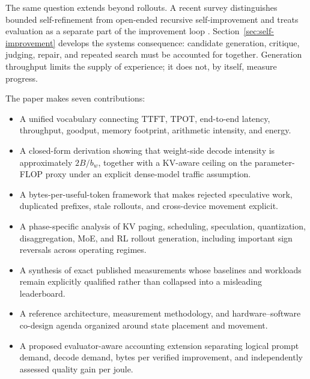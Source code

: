 \documentclass[journal]{IEEEtran}
\newcommand{\TTFT}{\ensuremath{\mathrm{TTFT}}}
\newcommand{\TPOT}{\ensuremath{\mathrm{TPOT}}}
\begin{document}
The same question extends beyond rollouts. A recent survey distinguishes bounded self-refinement from open-ended recursive self-improvement and treats evaluation as a separate part of the improvement loop \cite{chen2026rsi}. Section~\ref{sec:self-improvement} develops the systems consequence: candidate generation, critique, judging, repair, and repeated search must be accounted for together. Generation throughput limits the supply of experience; it does not, by itself, measure progress.

The paper makes seven contributions:
\begin{itemize}
    \item A unified vocabulary connecting \TTFT, \TPOT, end-to-end latency, throughput, goodput, memory footprint, arithmetic intensity, and energy.
    \item A closed-form derivation showing that weight-side decode intensity is approximately $2B/b_w$, together with a KV-aware ceiling on the parameter-FLOP proxy under an explicit dense-model traffic assumption.
    \item A bytes-per-useful-token framework that makes rejected speculative work, duplicated prefixes, stale rollouts, and cross-device movement explicit.
    \item A phase-specific analysis of KV paging, scheduling, speculation, quantization, disaggregation, MoE, and RL rollout generation, including important sign reversals across operating regimes.
    \item A synthesis of exact published measurements whose baselines and workloads remain explicitly qualified rather than collapsed into a misleading leaderboard.
    \item A reference architecture, measurement methodology, and hardware--software co-design agenda organized around state placement and movement.
    \item A proposed evaluator-aware accounting extension separating logical prompt demand, decode demand, bytes per verified improvement, and independently assessed quality gain per joule.
\end{itemize}
\end{document}
